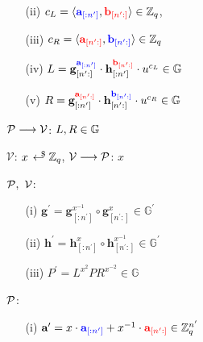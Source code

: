 \begin{mdframed}[skipabove=\topsep]
\begin{itemize}[itemsep=4pt]
\begin{enumerate}[itemsep=5pt]
            \item[(ii)] $c_L = \langle \textcolor{blue}{\textbf{a}_{[:n^{\prime}]}},
            \textcolor{red}{\textbf{b}_{[n^{\prime}:]}}
            \rangle \in \Z_q$, 

            \item[(iii)] $c_R = \langle \textcolor{red}{\textbf{a}_{[n^{\prime}:]}},
            \textcolor{blue}{\textbf{b}_{[n^{\prime}:]}}
            \rangle \in \Z_q$

            \item[(iv)] $L = \textbf{g}^{\textcolor{blue}{\textbf{a}_{[:n^{\prime}]}}}_{[n^{\prime}:]} 
            \cdot \textbf{h}^{\textcolor{red}{\textbf{b}_{[n^{\prime}:]}}}_{[:n^{\prime}]} \cdot u^{c_L} \in \mathbb{G}$
 
            \item[(v)] $R = \textbf{g}^{\textcolor{red}{\textbf{a}_{[n^{\prime}:]}}}_{[:n^{\prime}]} 
            \cdot \textbf{h}^{\textcolor{blue}{\textbf{b}_{[n^{\prime}:]}}}_{[n^{\prime}:]} \cdot u^{c_R} \in \mathbb{G}$
        \end{enumerate}
      
        \item[] $\mathcal{P} \longrightarrow \V$: $L,R \in \G$
    
        \item[] $\mathcal{V}$: $x \rgen \Z_q$, $\mathcal{V} \longrightarrow \P$: $x$
    

        \item[] $\P, \ \V$:
        \begin{enumerate}[itemsep=5pt]
            \item[(i)] $\textbf{g}^{\prime} = \textbf{g}^{x^{-1}}_{[:n^{\prime}]} \circ \textbf{g}^x_{[n^{\prime}:]} \in \mathbb{G}^{\prime}$

            \item[(ii)] $\textbf{h}^{\prime} = \textbf{h}^x_{[:n^{\prime}]} \circ \textbf{h}^{x^{-1}}_{[n^{\prime}:]} \in \mathbb{G}^{\prime}$

            \item[(iii)] $P^{\prime} = L^{x^2}PR^{x^{-2}} \in \mathbb{G}$
        \end{enumerate}
    
        \item[] $\P$:
        \begin{enumerate}[itemsep=5pt]
            \item[(i)] $\textbf{a}^{\prime} = x \cdot
            \textcolor{blue}{\textbf{a}_{[:n^{\prime}]}} + x^{-1}\cdot
            \textcolor{red}{\textbf{a}_{[n^{\prime}:]}}
            \in \Z^{n^{\prime}}_q$


\end{enumerate}
\end{itemize}
\end{mdframed}
